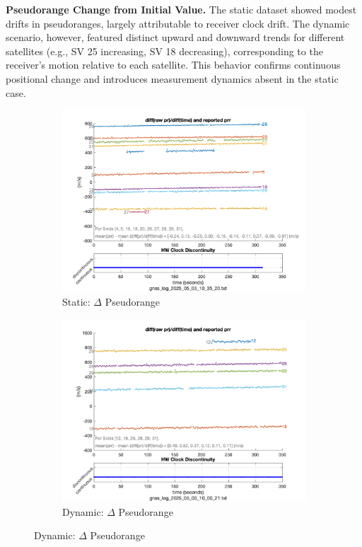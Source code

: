         \vspace{0.5em}
        \textbf{Pseudorange Change from Initial Value.} 
        The static dataset showed modest drifts in pseudoranges, largely attributable to receiver clock drift. 
        The dynamic scenario, however, featured distinct upward and downward trends for different satellites (e.g., SV 25 increasing, SV 18 decreasing), corresponding to the receiver's motion relative to each satellite. 
        This behavior confirms continuous positional change and introduces measurement dynamics absent in the static case.
    
        \begin{figure}[H]
            \centering
            \begin{subfigure}{0.23\textwidth}
                \includegraphics[width=\textwidth]{images/tests/Monte_Cappuccini/png/Samsung_A51_Monte_Cappuccini_fig2.png}
                \caption{Static: $\Delta$ Pseudorange}
            \end{subfigure}
            \hfill
            \begin{subfigure}{0.23\textwidth}
                \includegraphics[width=\textwidth]{images/tests/Tram_15_trip_Castello_to_Pescatore/filtered/Samsung_A51_Tram_15_trip_Castello_to_Pescatore_fig2.png}
                \caption{Dynamic: $\Delta$ Pseudorange}
            \end{subfigure}
        \end{figure}
